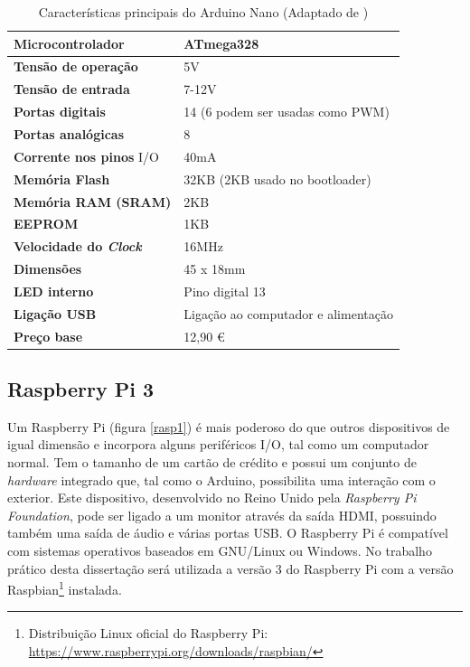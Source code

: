\begin{table}[h]
	\centering
	
	\begin{tabular}{|
			>{\columncolor[HTML]{EFEFEF}}l |l|} \hline
		\textbf{Microcontrolador} & ATmega328 \\ \hline
		\textbf{Tensão de operação} & 5V \\ \hline
		\textbf{Tensão de entrada} & 7-12V \\ \hline
		\textbf{Portas digitais} & 14 (6 podem ser usadas como PWM) \\ \hline
		\textbf{Portas analógicas} & 8 \\ \hline
		\textbf{Corrente nos pinos} \ac{I/O} & 40mA \\ \hline
		\textbf{Memória Flash} & 32KB (2KB usado no bootloader) \\ \hline
		\textbf{Memória \acs{RAM} (SRAM)} & 2KB \\ \hline
		\textbf{EEPROM} & 1KB \\ \hline
		\textbf{Velocidade do \textit{Clock}} & 16MHz \\ \hline
		\textbf{Dimensões} & 45 x 18mm \\ \hline
		\textbf{\ac{LED} interno} & Pino digital 13 \\ \hline
		\textbf{Ligação \ac{USB}} & Ligação ao computador e alimentação \\ \hline
		\textbf{Preço base} & 12,90 \euro \footnotemark  \\ \hline
	\end{tabular}
	\caption[Características principais do Arduino Nano]{Características principais do Arduino Nano (Adaptado de \cite{Melorose2015})}
	\label{caraarduino}
\end{table}





\subsection{Raspberry Pi 3}

Um Raspberry Pi (figura \ref{rasp1}) é mais poderoso do que outros dispositivos de igual dimensão e incorpora alguns periféricos \ac{I/O}, tal como um computador normal. Tem o tamanho de um cartão de crédito e possui um conjunto de \textit{hardware} integrado que, tal como o Arduino, possibilita uma interação com o exterior. Este dispositivo, desenvolvido no Reino Unido pela \textit{Raspberry Pi Foundation}, pode ser ligado a um monitor através da saída HDMI, possuindo também uma saída de áudio e várias portas \ac{USB}. O Raspberry Pi é compatível com sistemas operativos baseados em GNU/Linux ou Windows. No trabalho prático desta dissertação será utilizada a versão 3 do Raspberry Pi com a versão Raspbian\footnote{Distribuição Linux oficial do Raspberry Pi:  \url{https://www.raspberrypi.org/downloads/raspbian/}} instalada\cite{RaspberryPiFoundation2012}.

